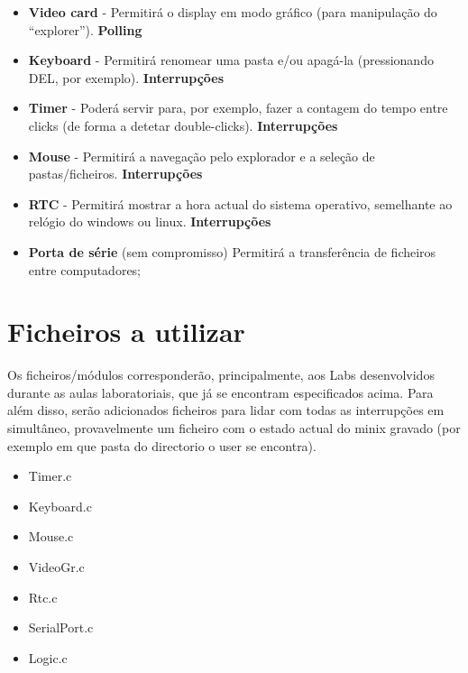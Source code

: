 \documentclass[a4paper]{article}
\begin{document}
  
 \begin{itemize}  
\item  \textbf{Video card} - Permitirá o display em modo gráfico (para manipulação do “explorer”). \textbf{Polling}
 
\item \textbf{Keyboard} - Permitirá renomear uma pasta e/ou apagá-la (pressionando DEL, por exemplo). \textbf{Interrupções}
 
\item \textbf{Timer} - Poderá servir para, por exemplo, fazer a contagem do tempo entre clicks (de forma a detetar double-clicks).  \textbf{Interrupções}
 
\item \textbf{Mouse} - Permitirá a navegação pelo explorador e a seleção de pastas/ficheiros.  \textbf{Interrupções}
 
\item \textbf{RTC} - Permitirá mostrar a hora actual do sistema operativo, semelhante ao relógio do windows ou linux.  \textbf{Interrupções}
 
\item \textbf{Porta de série} (sem compromisso)
Permitirá a transferência de ficheiros entre computadores;

 \end{itemize}  


\section{Ficheiros a utilizar}
 
Os ficheiros/módulos corresponderão, principalmente, aos Labs desenvolvidos durante as aulas laboratoriais, que já se encontram especificados acima. Para além disso, serão adicionados ficheiros para lidar com todas as interrupções em simultâneo, provavelmente um ficheiro com o estado actual do minix gravado (por exemplo em que pasta do directorio o user se encontra).



\begin{itemize}
  \item Timer.c
  \item Keyboard.c
  \item Mouse.c
  \item VideoGr.c
  \item Rtc.c
  \item SerialPort.c
  \item Logic.c
  
\end{itemize}
\end{document}
